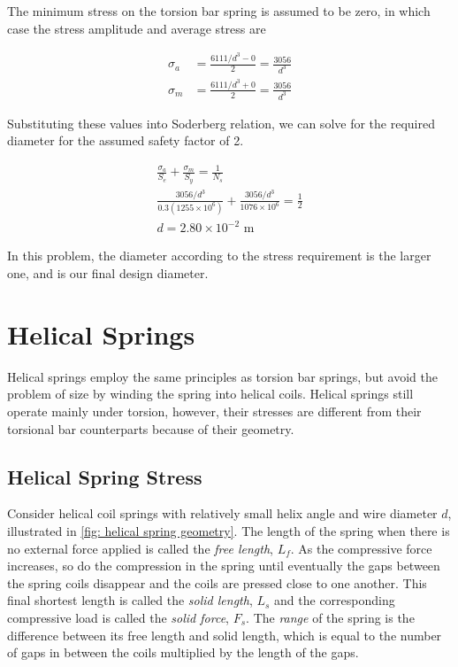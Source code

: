 \documentclass[
10pt,
a4paper,
openany,
svgnames,
]{book}
\begin{document}
\begin{solution}
  The minimum stress on the torsion bar spring is assumed to be zero, in which case the stress amplitude and average stress are

  \begin{align*}
    \sigma_a &= \frac{6111/d^3 - 0}{2} = \frac{3056}{d^3} \\
    \sigma_m &= \frac{6111/d^3 + 0}{2} = \frac{3056}{d^3}
  \end{align*}

  Substituting these values into Soderberg relation, we can solve for the required diameter for the assumed safety factor of 2.

  \begin{gather*}
    \frac{\sigma_a}{S_e} + \frac{\sigma_m}{S_y} = \frac{1}{N_s} \\
    \frac{3056/d^3}{0.3(1255 \times 10^6)} + \frac{3056/d^3}{1076 \times 10^6} = \frac{1}{2} \\
    d = 2.80 \times 10^{-2} \text{ m}
  \end{gather*}

  In this problem, the diameter according to the stress requirement is the larger one, and is our final design diameter.
\end{solution}
  
\section{Helical Springs}

Helical springs employ the same principles as torsion bar springs, but avoid the problem of size by winding the spring into helical coils. Helical springs still operate mainly under torsion, however, their stresses are different from their torsional bar counterparts because of their geometry.

\subsection{Helical Spring Stress}

Consider helical coil springs with relatively small helix angle and wire diameter $d$, illustrated in \cref{fig: helical spring geometry}. The length of the spring when there is no external force applied is called the \emph{free length}, $L_f$. As the compressive force increases, so do the compression in the spring until eventually the gaps between the spring coils disappear and the coils are pressed close to one another. This final shortest length is called the \emph{solid length}, $L_s$ and the corresponding compressive load is called the \emph{solid force}, $F_s$. The \emph{range} of the spring is the difference between its free length and solid length, which is equal to the number of gaps in between the coils multiplied by the length of the gaps.
\end{document}
